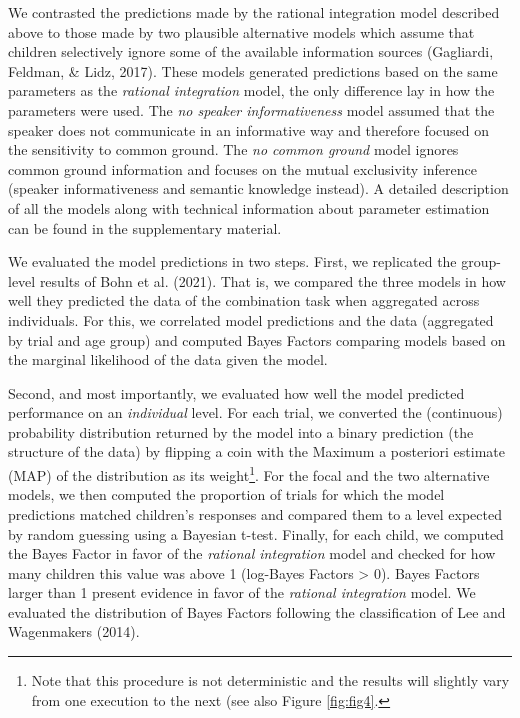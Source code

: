 \documentclass[
  man,floatsintext]{apa6}
\begin{document}
We contrasted the predictions made by the rational integration model described above to those made by two plausible alternative models which assume that children selectively ignore some of the available information sources (Gagliardi, Feldman, \& Lidz, 2017). These models generated predictions based on the same parameters as the \emph{rational integration} model, the only difference lay in how the parameters were used. The \emph{no speaker informativeness} model assumed that the speaker does not communicate in an informative way and therefore focused on the sensitivity to common ground. The \emph{no common ground} model ignores common ground information and focuses on the mutual exclusivity inference (speaker informativeness and semantic knowledge instead). A detailed description of all the models along with technical information about parameter estimation can be found in the supplementary material.

We evaluated the model predictions in two steps. First, we replicated the group-level results of Bohn et al. (2021). That is, we compared the three models in how well they predicted the data of the combination task when aggregated across individuals. For this, we correlated model predictions and the data (aggregated by trial and age group) and computed Bayes Factors comparing models based on the marginal likelihood of the data given the model.

Second, and most importantly, we evaluated how well the model predicted performance on an \emph{individual} level. For each trial, we converted the (continuous) probability distribution returned by the model into a binary prediction (the structure of the data) by flipping a coin with the Maximum a posteriori estimate (MAP) of the distribution as its weight\footnote{Note that this procedure is not deterministic and the results will slightly vary from one execution to the next (see also Figure \ref{fig:fig4}.}. For the focal and the two alternative models, we then computed the proportion of trials for which the model predictions matched children's responses and compared them to a level expected by random guessing using a Bayesian t-test. Finally, for each child, we computed the Bayes Factor in favor of the \emph{rational integration} model and checked for how many children this value was above 1 (log-Bayes Factors \textgreater{} 0). Bayes Factors larger than 1 present evidence in favor of the \emph{rational integration} model. We evaluated the distribution of Bayes Factors following the classification of Lee and Wagenmakers (2014).
\end{document}
